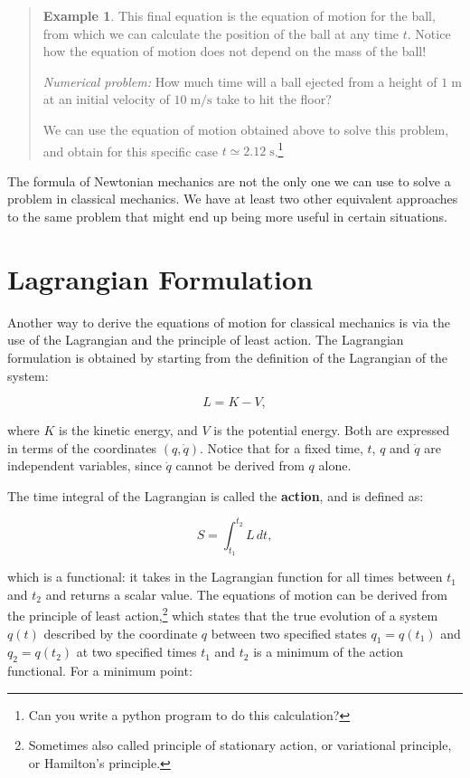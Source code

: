 \documentclass[
  9pt,
]{extbook}
\theoremstyle{definition}
\theoremstyle{definition}
\newtheorem{example}{Example}[chapter]
\theoremstyle{definition}
\theoremstyle{remark}
\begin{document}
\begin{quote}
\begin{example}
This final equation is the equation of motion for the ball, from which we can calculate the position of the ball at any time \(t\). Notice how the equation of motion does not depend on the mass of the ball!

\emph{Numerical problem:} How much time will a ball ejected from a height of \(1 \;\mathrm{m}\) at an initial velocity of \(10 \;\mathrm{m/s}\) take to hit the floor?

We can use the equation of motion obtained above to solve this problem, and obtain for this specific case \(t\simeq2.12\;\mathrm{s}\).\footnote{Can you write a python program to do this calculation?}
\end{example}
\end{quote}

The formula of Newtonian mechanics are not the only one we can use to solve a problem in classical mechanics. We have at least two other equivalent approaches to the same problem that might end up being more useful in certain situations.

\hypertarget{lagrangian-formulation}{%
\section{Lagrangian Formulation}\label{lagrangian-formulation}}

Another way to derive the equations of motion for classical mechanics is via the use of the Lagrangian and the principle of least action. The Lagrangian formulation is obtained by starting from the definition of the Lagrangian of the system:

\begin{equation}
L = K - V,
\label{eq:lag1}
\end{equation}

where \(K\) is the kinetic energy, and \(V\) is the potential energy. Both are expressed in terms of the coordinates \((q,\dot{q})\). Notice that for a fixed time, \(t\), \(q\) and \(\dot{q}\) are independent variables, since \(\dot{q}\) cannot be derived from \(q\) alone.

The time integral of the Lagrangian is called the \textbf{action}, and is defined as:

\begin{equation}
S = \int_{t_1}^{t_2} L\, dt,
\label{eq:lag2}
\end{equation}

which is a functional: it takes in the Lagrangian function for all times between \(t_1\) and \(t_2\) and returns a scalar value. The equations of motion can be derived from the principle of least action,\footnote{Sometimes also called principle of stationary action, or variational principle, or Hamilton's principle.} which states that the true evolution of a system \(q(t)\) described by the coordinate \(q\) between two specified states \(q_1 = q(t_1)\) and \(q_2 = q(t_2)\) at two specified times \(t_1\) and \(t_2\) is a minimum of the action functional. For a minimum point:
\end{document}
